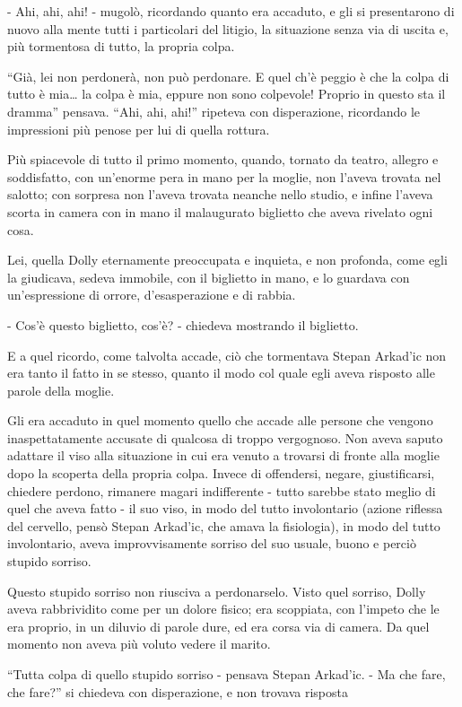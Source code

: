 - Ahi, ahi, ahi! - mugolò, ricordando quanto era accaduto, e gli si presentarono di nuovo alla mente tutti i particolari del litigio, la situazione senza via di uscita e, più tormentosa di tutto, la propria colpa. 

``Già, lei non perdonerà, non può perdonare. E quel ch'è peggio è che la colpa di tutto è mia\ldots{} la colpa è mia, eppure non sono colpevole! Proprio in questo sta il dramma'' pensava. ``Ahi, ahi, ahi!'' ripeteva con disperazione, ricordando le impressioni più penose per lui di quella rottura. 

Più spiacevole di tutto il primo momento, quando, tornato da teatro, allegro e soddisfatto, con un'enorme pera in mano per la moglie, non l'aveva trovata nel salotto; con sorpresa non l'aveva trovata neanche nello studio, e infine l'aveva scorta in camera con in mano il malaugurato biglietto che aveva rivelato ogni cosa. 

Lei, quella Dolly eternamente preoccupata e inquieta, e non profonda, come egli la giudicava, sedeva immobile, con il biglietto in mano, e lo guardava con un'espressione di orrore, d'esasperazione e di rabbia. 

- Cos'è questo biglietto, cos'è? - chiedeva mostrando il biglietto. 

E a quel ricordo, come talvolta accade, ciò che tormentava Stepan Arkad'ic non era tanto il fatto in se stesso, quanto il modo col quale egli aveva risposto alle parole della moglie. 

Gli era accaduto in quel momento quello che accade alle persone che vengono inaspettatamente accusate di qualcosa di troppo vergognoso. Non aveva saputo adattare il viso alla situazione in cui era venuto a trovarsi di fronte alla moglie dopo la scoperta della propria colpa. Invece di offendersi, negare, giustificarsi, chiedere perdono, rimanere magari indifferente - tutto sarebbe stato meglio di quel che aveva fatto - il suo viso, in modo del tutto involontario (azione riflessa del cervello, pensò Stepan Arkad'ic, che amava la fisiologia), in modo del tutto involontario, aveva improvvisamente sorriso del suo usuale, buono e perciò stupido sorriso. 

Questo stupido sorriso non riusciva a perdonarselo. Visto quel sorriso, Dolly aveva rabbrividito come per un dolore fisico; era scoppiata, con l'impeto che le era proprio, in un diluvio di parole dure, ed era corsa via di camera. Da quel momento non aveva più voluto vedere il marito. 

``Tutta colpa di quello stupido sorriso - pensava Stepan Arkad'ic. - Ma che fare, che fare?'' si chiedeva con disperazione, e non trovava risposta 


